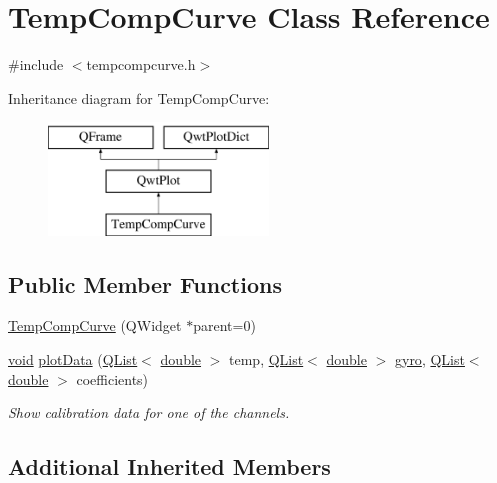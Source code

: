 \hypertarget{class_temp_comp_curve}{\section{Temp\-Comp\-Curve Class Reference}
\label{class_temp_comp_curve}
}


{\ttfamily \#include $<$tempcompcurve.\-h$>$}

Inheritance diagram for Temp\-Comp\-Curve\-:\begin{figure}[H]
\begin{center}
\leavevmode
\includegraphics[height=3.000000cm]{class_temp_comp_curve}
\end{center}
\end{figure}
\subsection*{Public Member Functions}
\begin{DoxyCompactItemize}
\item 
\hyperlink{group___config_plugin_gadde0ad4527ea2096cecb195d2a635014}{Temp\-Comp\-Curve} (Q\-Widget $\ast$parent=0)
\item 
\hyperlink{group___u_a_v_objects_plugin_ga444cf2ff3f0ecbe028adce838d373f5c}{void} \hyperlink{group___config_plugin_ga19bcca9caf37d6e7360270c37542d1b5}{plot\-Data} (\hyperlink{class_q_list}{Q\-List}$<$ \hyperlink{_super_l_u_support_8h_a8956b2b9f49bf918deed98379d159ca7}{double} $>$ temp, \hyperlink{class_q_list}{Q\-List}$<$ \hyperlink{_super_l_u_support_8h_a8956b2b9f49bf918deed98379d159ca7}{double} $>$ \hyperlink{_parse_e_k_f_log_8m_ad080000332893e19cac48f8ea3c58647}{gyro}, \hyperlink{class_q_list}{Q\-List}$<$ \hyperlink{_super_l_u_support_8h_a8956b2b9f49bf918deed98379d159ca7}{double} $>$ coefficients)
\begin{DoxyCompactList}\small\item\em Show calibration data for one of the channels. \end{DoxyCompactList}\end{DoxyCompactItemize}
\subsection*{Additional Inherited Members}


